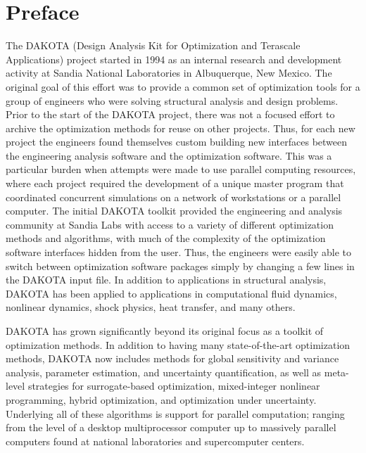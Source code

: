 \chapter*{Preface}

The DAKOTA (Design Analysis Kit for Optimization and Terascale
Applications) project started in 1994 as an internal research and
development activity at Sandia National Laboratories in Albuquerque,
New Mexico. The original goal of this effort was to provide a common
set of optimization tools for a group of engineers who were solving
structural analysis and design problems. Prior to the start of the
DAKOTA project, there was not a focused effort to archive the
optimization methods for reuse on other projects. Thus, for each new
project the engineers found themselves custom building new interfaces
between the engineering analysis software and the optimization
software. This was a particular burden when attempts were made to use
parallel computing resources, where each project required the
development of a unique master program that coordinated concurrent
simulations on a network of workstations or a parallel computer. The
initial DAKOTA toolkit provided the engineering and analysis community
at Sandia Labs with access to a variety of different optimization
methods and algorithms, with much of the complexity of the
optimization software interfaces hidden from the user. Thus, the
engineers were easily able to switch between optimization software
packages simply by changing a few lines in the DAKOTA input file. In
addition to applications in structural analysis, DAKOTA has been
applied to applications in computational fluid dynamics, nonlinear
dynamics, shock physics, heat transfer, and many others.

DAKOTA has grown significantly beyond its original focus as a toolkit
of optimization methods. In addition to having many state-of-the-art
optimization methods, DAKOTA now includes methods for global
sensitivity and variance analysis, parameter estimation, and
uncertainty quantification, as well as meta-level strategies for
surrogate-based optimization, mixed-integer nonlinear programming,
hybrid optimization, and optimization under uncertainty. Underlying
all of these algorithms is support for parallel computation; ranging
from the level of a desktop multiprocessor computer up to massively
parallel computers found at national laboratories and supercomputer
centers.

